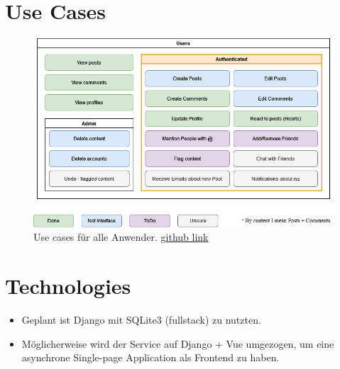 \documentclass[11pt]{article}
\begin{document}
    \section{Use Cases}\label{sec:use-cases}
    \begin{figure}[h]
        \centering
        \includegraphics[height=0.5\textwidth]{../d_usecase.drawio}
        \caption{Use cases für alle Anwender. \href{https://github.com/MKrabs/Blog/blob/main/docs/d_usecase.drawio.png}{github link}}
        \label{fig:use-cases}
    \end{figure}


    \section{Technologies}\label{sec:technologies}

    \begin{itemize}
        \item Geplant ist Django mit SQLite3 (fullstack) zu nutzten.
        \item M\"oglicherweise wird der Service auf Django + Vue umgezogen, um eine asynchrone Single-page Application als Frontend zu haben.
    \end{itemize}
\end{document}
